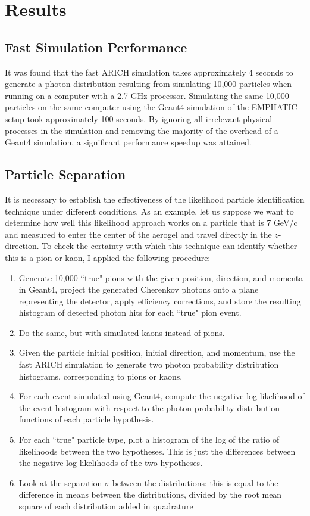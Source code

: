 
\chapter{Results}
\label{ch:Results}

\section{Fast Simulation Performance}
It was found that the fast ARICH simulation takes approximately 4 seconds to generate a photon distribution resulting from simulating 10,000 particles when running on a computer with a 2.7 GHz processor. 
Simulating the same 10,000 particles on the same computer using the Geant4 simulation of the EMPHATIC setup took approximately 100 seconds.
By ignoring all irrelevant physical processes in the simulation and removing the majority of the overhead of a Geant4 simulation, a significant performance speedup was attained.

\section{Particle Separation}
It is necessary to establish the effectiveness of the likelihood particle identification technique under different conditions.
As an example, let us suppose we want to determine how well this likelihood approach works on a particle that is 7 GeV/c and measured to enter the center of the aerogel and travel directly in the $z$-direction.
To check the certainty with which this technique can identify whether this is a pion or kaon, I applied the following procedure:

\begin{enumerate}
\item Generate 10,000 ``true" pions with the given position, direction, and momenta in Geant4, project the generated Cherenkov photons onto a plane representing the detector, apply efficiency corrections, and store the resulting histogram of detected photon hits for each ``true" pion event. 
\item Do the same, but with simulated kaons instead of pions.
\item Given the particle initial position, initial direction, and momentum, use the fast ARICH simulation to generate two photon probability distribution histograms, corresponding to pions or kaons.
\item For each event simulated using Geant4, compute the negative log-likelihood of the event histogram with respect to the photon probability distribution functions of each particle hypothesis.
\item For each ``true" particle type, plot a histogram of the log of the ratio of likelihoods between the two hypotheses.
This is just the differences between the negative log-likelihoods of the two hypotheses.
\item Look at the separation $\sigma$ between the distributions: this is equal to the difference in means between the distributions, divided by the root mean square of each distribution added in quadrature
\end{enumerate}

